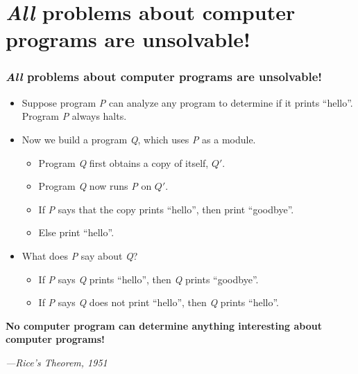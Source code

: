\documentclass[slidestop,xcolor=pst]{beamer}
\newcommand{\sect}[1]{
\section{#1}
\begin{frame}[fragile]\frametitle{#1}
}
\begin{document}
\sect{{\em All} problems about computer programs are unsolvable!}

\begin{itemize}
\item Suppose  program {\em P} can
  analyze any program to determine if it prints ``hello''.  Program {\em P}
  always halts.
  
\item Now we build a program {\em Q}, which uses {\em P} as a module.
\begin{itemize}

\item Program {\em Q} first obtains a copy of itself, $Q'$.

\item Program {\em Q} now runs {\em P} on $Q'$.

\item If {\em P} says that the copy prints ``hello'', then print ``goodbye''.
\item Else print ``hello''.
\end{itemize}

\item  What does {\em P} say about {\em Q}?
\begin{itemize}

\item If {\em P} says {\em Q} prints ``hello'', then {\em Q} prints ``goodbye''.

\item If {\em P} says {\em Q} does not print ``hello'', then {\em Q} prints ``hello''.
\end{itemize}
\end{itemize}

\vfill

{\bf\large No computer program can determine anything interesting about 
computer programs!}

\hfill {\sl\large ---Rice's Theorem, 1951}


\vfill

\end{frame}
\end{document}
